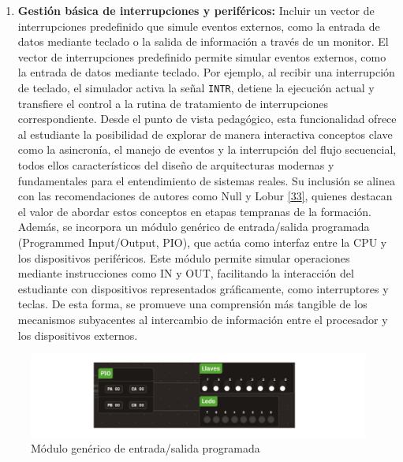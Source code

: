 \documentclass[12pt,oneside]{templates/unerthesis}
\providecommand{\tightlist}{%
  \setlength{\itemsep}{0pt}\setlength{\parskip}{0pt}}
\begin{document}
\begin{enumerate}
\def\labelenumi{\arabic{enumi}.}
\setcounter{enumi}{4}
\tightlist
\item
  \textbf{Gestión básica de interrupciones y periféricos:}
  Incluir un vector de interrupciones predefinido que simule eventos externos, como la entrada de datos mediante teclado o la salida de información a través de un monitor. El vector de interrupciones predefinido permite simular eventos externos, como la entrada de datos mediante teclado. Por ejemplo, al recibir una interrupción de teclado, el simulador activa la señal \texttt{INTR}, detiene la ejecución actual y transfiere el control a la rutina de tratamiento de interrupciones correspondiente. Desde el punto de vista pedagógico, esta funcionalidad ofrece al estudiante la posibilidad de explorar de manera interactiva conceptos clave como la asincronía, el manejo de eventos y la interrupción del flujo secuencial, todos ellos característicos del diseño de arquitecturas modernas y fundamentales para el entendimiento de sistemas reales. Su inclusión se alinea con las recomendaciones de autores como Null y Lobur \protect\hyperlink{ref-null_essentials_2023}{{[}33{]}}, quienes destacan el valor de abordar estos conceptos en etapas tempranas de la formación. Además, se incorpora un módulo genérico de entrada/salida programada (Programmed Input/Output, PIO), que actúa como interfaz entre la CPU y los dispositivos periféricos. Este módulo permite simular operaciones mediante instrucciones como IN y OUT, facilitando la interacción del estudiante con dispositivos representados gráficamente, como interruptores y teclas. De esta forma, se promueve una comprensión más tangible de los mecanismos subyacentes al intercambio de información entre el procesador y los dispositivos externos.
\end{enumerate}

\begin{figure}

{\centering \includegraphics[width=0.85\linewidth]{images/perifericos} 

}

\caption{Módulo genérico de entrada/salida programada}\label{fig:perifericos}
\end{figure}
\end{document}
